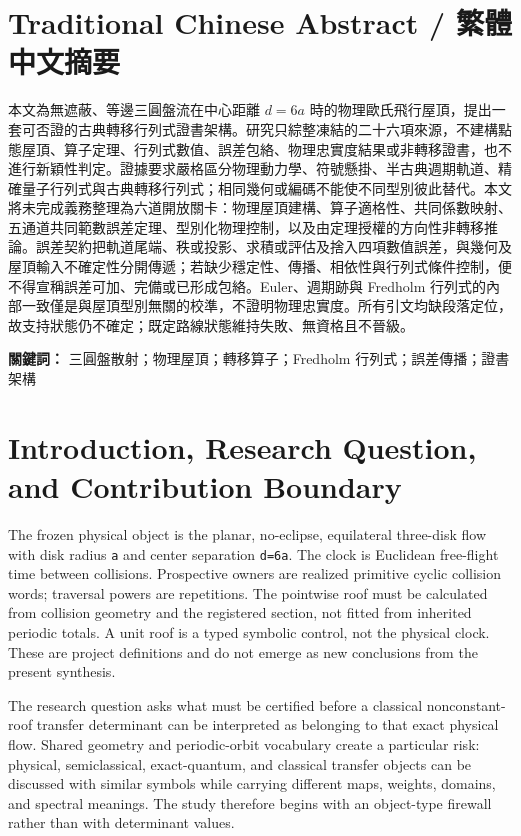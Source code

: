 \documentclass[11pt,a4paper]{article}
\begin{document}
\begin{otherlanguage}{chinese-traditional}
\section*{Traditional Chinese Abstract / 繁體中文摘要}
本文為無遮蔽、等邊三圓盤流在中心距離 \(d=6a\) 時的物理歐氏飛行屋頂，提出一套可否證的古典轉移行列式證書架構。研究只綜整凍結的二十六項來源，不建構點態屋頂、算子定理、行列式數值、誤差包絡、物理忠實度結果或非轉移證書，也不進行新穎性判定。證據要求嚴格區分物理動力學、符號懸掛、半古典週期軌道、精確量子行列式與古典轉移行列式；相同幾何或編碼不能使不同型別彼此替代。本文將未完成義務整理為六道開放關卡：物理屋頂建構、算子適格性、共同係數映射、五通道共同範數誤差定理、型別化物理控制，以及由定理授權的方向性非轉移推論。誤差契約把軌道尾端、秩或投影、求積或評估及捨入四項數值誤差，與幾何及屋頂輸入不確定性分開傳遞；若缺少穩定性、傳播、相依性與行列式條件控制，便不得宣稱誤差可加、完備或已形成包絡。Euler、週期跡與 Fredholm 行列式的內部一致僅是與屋頂型別無關的校準，不證明物理忠實度。所有引文均缺段落定位，故支持狀態仍不確定；既定路線狀態維持失敗、無資格且不晉級。

\noindent\textbf{關鍵詞：} 三圓盤散射；物理屋頂；轉移算子；Fredholm 行列式；誤差傳播；證書架構
\end{otherlanguage}

\section{Introduction, Research Question, and Contribution Boundary}

The frozen physical object is the planar, no-eclipse, equilateral three-disk flow with disk radius \texttt{a} and center separation \texttt{d=6a}. The clock is Euclidean free-flight time between collisions. Prospective owners are realized primitive cyclic collision words; traversal powers are repetitions. The pointwise roof must be calculated from collision geometry and the registered section, not fitted from inherited periodic totals. A unit roof is a typed symbolic control, not the physical clock. These are project definitions and do not emerge as new conclusions from the present synthesis.

The research question asks what must be certified before a classical nonconstant-roof transfer determinant can be interpreted as belonging to that exact physical flow. Shared geometry and periodic-orbit vocabulary create a particular risk: physical, semiclassical, exact-quantum, and classical transfer objects can be discussed with similar symbols while carrying different maps, weights, domains, and spectral meanings. The study therefore begins with an object-type firewall rather than with determinant values.
\end{document}
